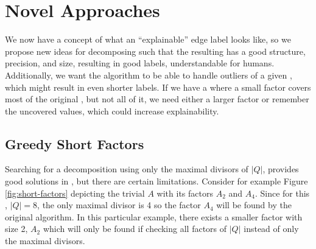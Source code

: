 \chapter{Novel Approaches}
\label{chap:novel-algos}
We now have a concept of what an \enquote{explainable} edge label looks like, so we propose new ideas for decomposing \DFAs such that the resulting \orDecomp has a good structure, precision, and size, resulting in good labels, understandable for humans.
Additionally, we want the algorithm to be able to handle outliers of a given \orDecomp, which might result in even shorter labels.
If we have a \orDecomp where a small factor covers most of the original \DFA, but not all of it, we need either a larger factor or remember the uncovered values, which could increase explainability.

\section{Greedy Short Factors}
\label{ch:novel-algos:greedy-short-factors}
Searching for a decomposition using only the maximal divisors of $|Q|$, provides good solutions in \LogSpace, but there are certain limitations.
Consider for example Figure \ref{fig:short-factors} depicting the trivial \DFA $A$ with its factors $A_2$ and $A_4$.
Since for this \DFA, $|Q| = 8$, the only maximal divisor is 4 so the factor $A_4$ will be found by the original algorithm.
In this particular example, there exists a smaller factor with size 2, $A_2$ which will only be found if checking all factors of $|Q|$ instead of only the maximal divisors.

